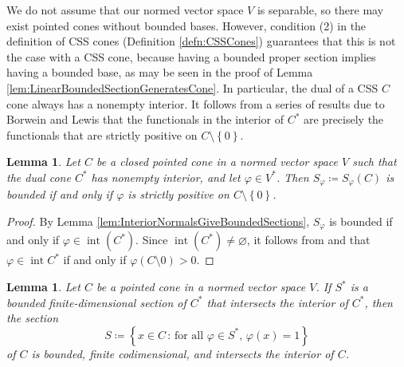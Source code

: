\documentclass[10pt]{amsart}
\newtheorem{lemma}[thm]{Lemma}
\theoremstyle{definition}
\theoremstyle{remark}
\begin{document}
We do not assume that our normed vector space $V$ is separable, so
there may exist pointed cones without bounded bases.  However,
condition (2) in the definition of CSS cones (Definition
\ref{defn:CSSCones}) guarantees that this is not the case with a
CSS cone, because having a bounded proper section implies having a
bounded base, as may be seen in the proof of Lemma
\ref{lem:LinearBoundedSectionGeneratesCone}.  In particular, the
dual of a CSS $C$ cone always has a nonempty interior.  It follows
from a series of results due to Borwein and Lewis that the
functionals in the interior of ${C^{\ast}}$ are precisely the
functionals that are strictly positive on $C \setminus {\left\lbrace {0} \right\rbrace}$.

\begin{lemma}
   \label{lem:BoundedSectionsStrictlySupport}
   Let $C$ be a closed pointed cone in a normed vector space $V$
   such that the dual cone ${{C}^{\ast}}$ has nonempty interior, and
   let ${\varphi} \in {V^{\ast}}$.  Then $S_{\varphi} {\mathrel{\coloneqq}} S_{\varphi}(C)$
   is bounded if and only if ${\varphi}$ is strictly positive on
   $C\setminus{\left\lbrace {0} \right\rbrace}$.
\end{lemma}
\begin{proof}
   By Lemma \ref{lem:InteriorNormalsGiveBoundedSections},
   $S_{\varphi}$ is bounded if and only if ${\varphi} \in
   {\operatorname{int}}({{C}^{\ast}})$.  Since ${\operatorname{int}}({{C}^{\ast}}) \ne {\varnothing}$, it
   follows from \cite[Corollary 2.14]{BorLew1992} and
   \cite[Theorem 3.10]{BorLew1992} that ${\varphi} \in {\operatorname{int}}{{{C}^{\ast}}}$
   if and only if ${\varphi}(C\setminus{0}) > 0$.
\end{proof}

\begin{lemma}
   \label{lem:PerpOfBoundedSectionIsBounded}
   Let $C$ be a pointed cone in a normed vector space $V$.  If
   ${{S}^{\ast}}$ is a bounded finite-dimensional section of ${C^{\ast}}$ that intersects the interior of ${C^{\ast}}$, then the section
   \begin{equation*}
      S {\mathrel{\coloneqq}} {\left\lbrace {x \in C {\,:\,} \text{for all ${\varphi} \in 
      {{S}^{\ast}}$, ${\varphi}(x) = 1$}} \right\rbrace}
   \end{equation*}
   of $C$ is bounded, finite codimensional, and intersects the
   interior of $C$.
\end{lemma}
\end{document}
